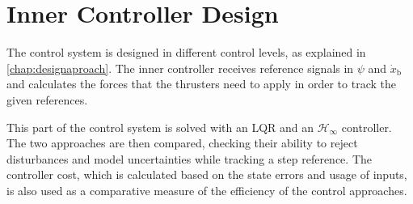 \chapter{Inner Controller Design}\label{chap:innercontrol}
The control system is designed in different control levels, as explained in \autoref{chap:designaproach}. The inner controller receives reference signals in $\psi$ and $\dot{x}_\mathrm{b}$ and calculates the forces that the thrusters need to apply in order to track the given references. 

This part of the control system is solved with an LQR and an $\mathcal{H}_\infty$ controller. The two approaches are then compared, checking their ability to reject disturbances and model uncertainties while tracking a step reference. The controller cost, which is calculated based on the state errors and usage of inputs, is also used as a comparative measure of the efficiency of the control approaches.



